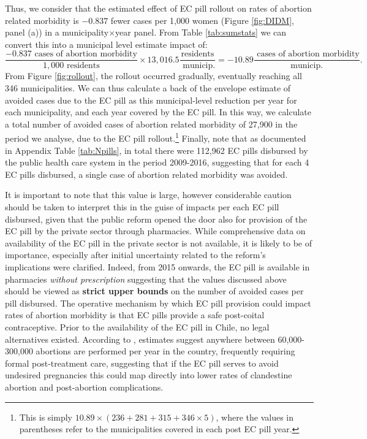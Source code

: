 \documentclass[12pt]{article}
\begin{document}
\begin{spacing}{1.9}
Thus, we consider that the estimated effect of EC pill rollout on rates of abortion related morbidity is $-0.837$ fewer cases per 1,000 women (Figure \ref{fig:DIDM}, panel (a)) in a municipality$\times$year panel.  From Table \ref{tab:sumstats} we can convert this into a municipal level estimate impact of:
\[
\frac{-0.837 \text{ cases of abortion morbidity}}{1,000 \text{ residents}}\times  13,016.5 \frac{\text{residents}}{\text{ municip.}}=-10.89 \frac{\text{ cases of abortion morbidity}}{\text{municip.}}.
\]
From Figure \ref{fig:rollout}, the rollout occurred gradually, eventually reaching all 346 municipalities.  We can thus calculate a back of the envelope estimate of avoided cases due to the EC pill as this municipal-level reduction per year for each municipality, and each year covered by the EC pill.  In this way, we calculate a total number of avoided cases of abortion related morbidity of 27,900 in the period we analyse, due to the EC pill rollout.\footnote{This is simply $10.89\times(236+281+315+346\times5)$, where the values in parentheses refer to the municipalities covered in each post EC pill year.}  Finally, note that as documented in Appendix Table \ref{tab:Npills}, in total there were 112,962 EC pills disbursed by the public health care system in the period 2009-2016, suggesting that for each 4 EC pills disbursed, a single case of abortion related morbidity was avoided.

It is important to note that this value is large, however considerable caution should be taken to interpret this in the guise of impacts per each EC pill disbursed, given that the public reform opened the door also for provision of the EC pill by the private sector through pharmacies.  While comprehensive data on availability of the EC pill in the private sector is not available, it is likely to be of importance, especially after initial uncertainty related to the reform's implications were clarified.  Indeed, from 2015 onwards, the EC pill is available in pharmacies \emph{without prescription} suggesting that the values discussed above should be viewed as \textbf{strict upper bounds} on the number of avoided cases per pill disbursed.  The operative mechanism by which EC pill provision could impact rates of abortion morbidity is that EC pills provide a safe post-coital contraceptive.  Prior to the availability of the EC pill in Chile, no legal alternatives existed.  According to \citet{PradaBall2016}, estimates suggest anywhere between 60,000-300,000 abortions are performed per year in the country, frequently requiring formal post-treatment care, suggesting that if the EC pill serves to avoid undesired pregnancies this could map directly into lower rates of clandestine abortion and post-abortion complications.  





\end{spacing}
\end{document}
